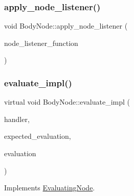 \mbox{\label{classBodyNode_adf1536979d1a57a735cc75290117afa4}} 
\subsubsection{\texorpdfstring{apply\+\_\+node\+\_\+listener()}{apply\_node\_listener()}}
{\footnotesize\ttfamily void Body\+Node\+::apply\+\_\+node\+\_\+listener (\begin{DoxyParamCaption}\item[{std\+::function$<$ bool(\hyperlink{classNode}{Node} $\ast$node, \hyperlink{classValue}{Value} v)$>$}]{node\+\_\+listener\+\_\+function }\end{DoxyParamCaption})}

\mbox{\label{classBodyNode_ab08c6586b725065afca095786b842991}} 
\subsubsection{\texorpdfstring{evaluate\+\_\+impl()}{evaluate\_impl()}}
{\footnotesize\ttfamily virtual void Body\+Node\+::evaluate\+\_\+impl (\begin{DoxyParamCaption}\item[{\hyperlink{classSystemHandler}{System\+Handler} $\ast$}]{handler,  }\item[{\hyperlink{statics_8h_a6664c451ca7787483a7981cc1de68dbb}{E\+V\+A\+L\+U\+A\+T\+I\+O\+N\+\_\+\+T\+Y\+PE}}]{expected\+\_\+evaluation,  }\item[{struct \hyperlink{structEvaluation}{Evaluation} $\ast$}]{evaluation }\end{DoxyParamCaption})\hspace{0.3cm}{\ttfamily [virtual]}}



Implements \hyperlink{classEvaluatingNode_a085fa06e0b46a93c814dc55cda0c1b26}{Evaluating\+Node}.

\mbox{\label{classBodyNode_a5ab94984d059dba1f7d2baa6022712ba}} 
